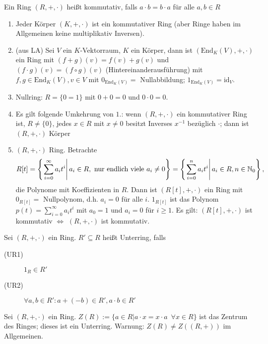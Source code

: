\documentclass[12pt,a4paper]{scrartcl}
\begin{document}
\begin{defi}
	Ein Ring $(R, +,\cdot)$ heißt kommutativ, falls $a\cdot b = b\cdot a$ für alle $a,b\in R$
\end{defi}	

\begin{bsp}
	\leavevmode
	\begin{enumerate}
		\item Jeder Körper $(K,+,\cdot)$ ist ein kommutativer Ring (aber Ringe haben im Allgemeinen keine multiplikativ Inversen).
		\item (aus LA) Sei $V$ ein $K$-Vektorraum, $K$ ein Körper, dann ist $(\text{End}_K(V),+,\cdot)$ ein Ring mit $(f+g)(v) = f(v)+g(v)$ und $(f\cdot g)(v) = (f\circ g)(v)$ (Hintereinanderausführung) mit $f,g\in \text{End}_K(V), v\in V$ mit $0_{\text{End}_K(V)} =$ Nullabbildung; $1_{\text{End}_K(V)} = \text{id}_V$.
		\item Nullring: $R = \{0=1\}$ mit $0+0 = 0$ und $0\cdot 0 = 0$.
		\item Es gilt folgende Umkehrung von $1.$: wenn $(R,+,\cdot)$ ein kommutativer Ring ist, $R\neq \{0\}$, jedes $x\in R$ mit $x\neq 0$ besitzt Inverses $x^{-1}$ bezüglich $\cdot$; dann ist $(R, +, \cdot )$ Körper
		\item $(R, +, \cdot)$ Ring. Betrachte
		\[ R[t] = \left\{ \left. \sum_{i=0}^{\infty} a_it^i \right| a_i\in R, \text{ nur endlich viele }a_i\neq 0\right\}  = \left\{\left. \sum_{i=0}^{n} a_it^i \right| a_i\in R, n\in \mathbb N_0\right\},\]
		die Polynome mit Koeffizienten in $R$. Dann ist $(R[t], +, \cdot)$ ein Ring mit $0_{R[t]} =$ Nullpolynom, d.h. $a_i = 0$ für alle $i$. $1_{R[t]}$ ist das Polynom $p(t) = \sum_{i = 0}^{\infty}a_it^i$ mit $a_0 = 1$ und $a_i = 0$ für $i\geq 1$.  Es gilt: $(R[t], +,\cdot)$ ist kommutativ $\Leftrightarrow$ $(R,+,\cdot)$ ist kommutativ.
	\end{enumerate}
\end{bsp}	

\begin{defi}
	Sei $(R,+,\cdot)$ ein Ring. $R'\subseteq R$ heißt Unterring, falls
	\begin{description}
		\item[(UR1)] $1_R\in R'$
		\item[(UR2)] $\forall a, b\in R': a+(-b)\in R', a\cdot b \in R'$
	\end{description}
\end{defi}

\begin{bsp}
	Sei $(R,+,\cdot)$ ein Ring. $Z(R) := \{a\in R|a\cdot x = x\cdot a \enspace \forall x\in R\}$ ist das Zentrum des Ringes; dieses ist ein Unterring. Warnung: $Z(R) \neq Z((R,+))$ im Allgemeinen.
\end{bsp}	
\end{document}
